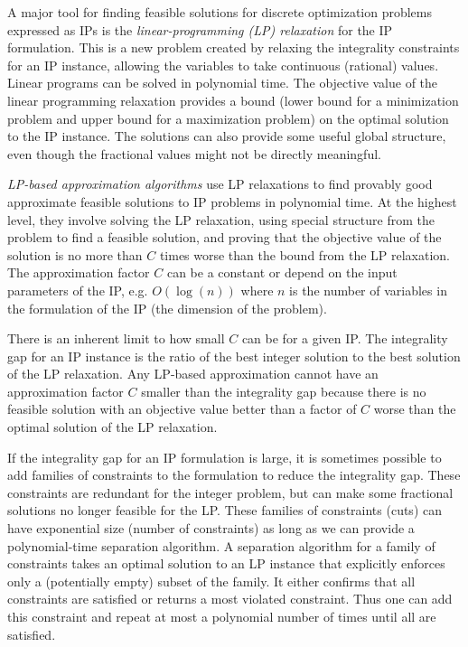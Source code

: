 \iffalse
However, there is substantial research into finding a feasible, provably-good approximate, and even (computationally) provably optimal solutions to specific IP instances. 
There is substantial research into finding a feasible, provably-good approximate solution for TODO, and even (computationally) provably optimal solutions to specific IP instances. \cindy{TODO: probably need to informally distinguish between a IP for a general problem, and a specific instance when the parameters are set.}
\fi

A major tool for finding feasible solutions for discrete optimization problems expressed as IPs is the {\em linear-programming (LP) relaxation} for the IP formulation. This is a new problem created by relaxing the integrality constraints for an IP instance, allowing the variables to take continuous (rational) values. Linear programs can be solved in polynomial time. The objective value of the linear programming relaxation provides a bound (lower bound for a minimization problem and upper bound for a maximization problem) on the optimal solution to the IP instance. The solutions can also provide some useful global structure, even though the fractional values might not be directly meaningful. 

{\em LP-based approximation algorithms} use LP relaxations to find provably good approximate feasible solutions to IP problems in polynomial time. At the highest level, they involve solving the LP relaxation, using special structure from the problem to find a feasible solution, and proving that the objective value of the solution is no more than $C$ times worse than the bound from the LP relaxation. The approximation factor $C$ can be a constant or depend on the input parameters of the IP, e.g. $O(\log(n))$ where $n$ is the number of variables in the formulation of the IP (the dimension of the problem).

There is an inherent limit to how small $C$ can be for a given IP. The integrality gap for an IP instance is the ratio of the best integer solution to the best solution of the LP relaxation. Any LP-based approximation cannot have an approximation factor $C$ smaller than the integrality gap because there is no feasible solution with an objective value better than a factor of $C$ worse than the optimal solution of the LP relaxation. 

If the integrality gap for an IP formulation is large, it is sometimes possible to add families of constraints to the formulation to reduce the integrality gap.  These constraints are redundant for the integer problem, but can make some fractional solutions no longer feasible for the LP. These families of constraints (cuts) can have exponential size (number of constraints) as long as we can provide a polynomial-time separation algorithm. A separation algorithm for a family of constraints takes an optimal solution to an LP instance that explicitly enforces only a (potentially empty) subset of the family. It either confirms that all constraints are satisfied or returns a most violated constraint. Thus one can add this constraint and repeat at most a polynomial number of times until all are satisfied.

